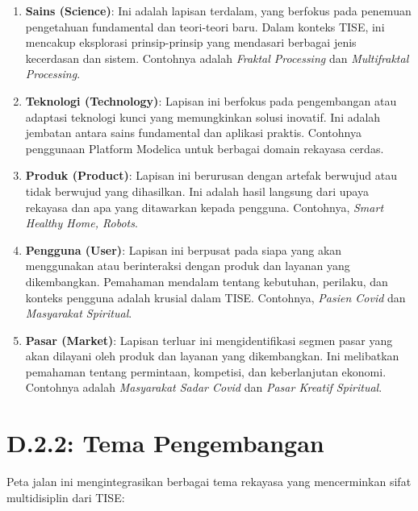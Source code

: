 \documentclass[
  letterpaper,
  DIV=11,
  numbers=noendperiod]{scrreprt}
\providecommand{\tightlist}{%
  \setlength{\itemsep}{0pt}\setlength{\parskip}{0pt}}
\begin{document}
\begin{enumerate}
\def\labelenumi{\arabic{enumi}.}
\tightlist
\item
  \textbf{Sains (Science)}: Ini adalah lapisan terdalam, yang berfokus
  pada penemuan pengetahuan fundamental dan teori-teori baru. Dalam
  konteks TISE, ini mencakup eksplorasi prinsip-prinsip yang mendasari
  berbagai jenis kecerdasan dan sistem. Contohnya adalah \emph{Fraktal
  Processing} dan \emph{Multifraktal Processing}.
\item
  \textbf{Teknologi (Technology)}: Lapisan ini berfokus pada
  pengembangan atau adaptasi teknologi kunci yang memungkinkan solusi
  inovatif. Ini adalah jembatan antara sains fundamental dan aplikasi
  praktis. Contohnya penggunaan Platform Modelica untuk berbagai domain
  rekayasa cerdas.
\item
  \textbf{Produk (Product)}: Lapisan ini berurusan dengan artefak
  berwujud atau tidak berwujud yang dihasilkan. Ini adalah hasil
  langsung dari upaya rekayasa dan apa yang ditawarkan kepada pengguna.
  Contohnya, \emph{Smart Healthy Home, Robots}.
\item
  \textbf{Pengguna (User)}: Lapisan ini berpusat pada siapa yang akan
  menggunakan atau berinteraksi dengan produk dan layanan yang
  dikembangkan. Pemahaman mendalam tentang kebutuhan, perilaku, dan
  konteks pengguna adalah krusial dalam TISE. Contohnya, \emph{Pasien
  Covid} dan \emph{Masyarakat Spiritual}.
\item
  \textbf{Pasar (Market)}: Lapisan terluar ini mengidentifikasi segmen
  pasar yang akan dilayani oleh produk dan layanan yang dikembangkan.
  Ini melibatkan pemahaman tentang permintaan, kompetisi, dan
  keberlanjutan ekonomi. Contohnya adalah \emph{Masyarakat Sadar Covid}
  dan \emph{Pasar Kreatif Spiritual}.
\end{enumerate}

\section{\texorpdfstring{\textbf{D.2.2: Tema
Pengembangan}}{D.2.2: Tema Pengembangan}}\label{d.2.2-tema-pengembangan-1}

Peta jalan ini mengintegrasikan berbagai tema rekayasa yang mencerminkan
sifat multidisiplin dari TISE:
\end{document}
